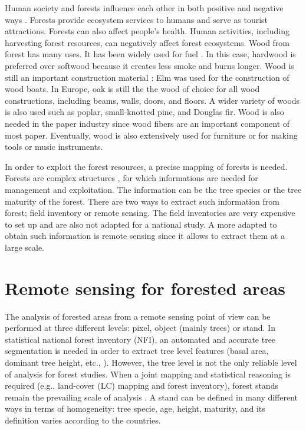 Human society and forests influence each other in both positive and negative ways \citep{vogt2006global}. Forests provide ecosystem services to humans and serve as tourist attractions. Forests can also affect people's health. Human activities, including harvesting forest resources, can negatively affect forest ecosystems. Wood from forest has many uses. It has been widely used for fuel \citep{sterrett1994alternative}. In this case, hardwood is preferred over softwood because it creates less smoke and burns longer.  Wood is still an important construction material \citep{ramage2017wood}: Elm was used for the construction of wood boats. In Europe, oak is still the the wood of choice for all wood constructions, including beams, walls, doors, and floors. A wider variety of woods is also used such as poplar, small-knotted pine, and Douglas fir. Wood is also needed in the paper industry since wood fibers are an important component of most paper. Eventually, wood is also extensively used for furniture or for making tools or music instruments.

In order to exploit the forest resources, a precise mapping of forests is needed.
Forests are complex structures \citep{pommerening2002approaches}, for which informations are needed for management and exploitation. The information can be the tree species or the tree maturity of the forest. There are two ways to extract such information from forest; field inventory or remote sensing. The field inventories are very expensive to set up and are also not adapted for a national study. A more adapted to obtain such information is remote sensing since it allows to extract them at a large scale. \\

\section{Remote sensing for forested areas}

The analysis of forested areas from a remote sensing point of view can be performed at three different levels: pixel, object (mainly trees) or stand. In statistical national forest inventory (NFI), an automated and accurate tree segmentation is needed in order to extract tree level features (basal area, dominant tree height, etc., \citep{means2000predicting,Malatamo}). However, the tree level is not the only reliable level of analysis for forest studies. When a joint mapping and statistical reasoning is required (e.g., land-cover (LC) mapping and forest inventory), forest stands remain the prevailing scale of analysis \citep{means2000predicting,White2016CJRS}. A stand can be defined in many different ways in terms of homogeneity: tree specie, age, height, maturity, and its definition varies according to the countries. \\

